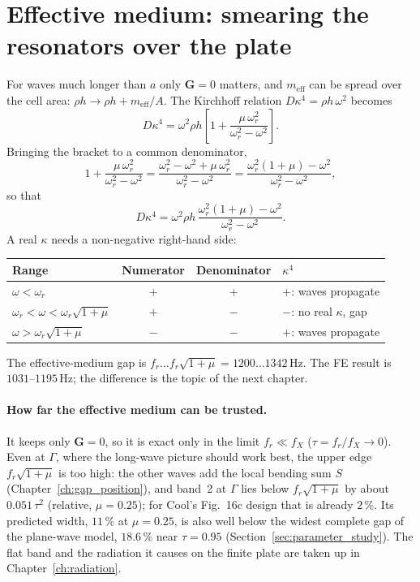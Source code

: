 \section{Effective medium: smearing the resonators over the plate}

For waves much longer than $a$ only $\mathbf{G} = 0$ matters, and $m_\mathrm{eff}$
can be spread over the cell area: $\rho h \to \rho h + m_\mathrm{eff}/A$. The
Kirchhoff relation $D\kappa^4 = \rho h\,\omega^2$ becomes
\begin{equation}
  D\kappa^4 = \omega^2 \rho h \left[1 + \frac{\mu\,\omega_r^2}{\omega_r^2 - \omega^2}\right] .
\end{equation}
Bringing the bracket to a common denominator,
\begin{equation}
  1 + \frac{\mu\,\omega_r^2}{\omega_r^2 - \omega^2}
  = \frac{\omega_r^2 - \omega^2 + \mu\,\omega_r^2}{\omega_r^2 - \omega^2}
  = \frac{\omega_r^2(1 + \mu) - \omega^2}{\omega_r^2 - \omega^2},
\end{equation}
so that
\begin{equation}
  D\kappa^4 = \omega^2 \rho h\,\frac{\omega_r^2(1 + \mu) - \omega^2}{\omega_r^2 - \omega^2} .
  \label{eq:effective_medium}
\end{equation}
A real $\kappa$ needs a non-negative right-hand side:
\begin{center}
\begin{tabular}{|l|c|c|l|}
\hline
Range & Numerator & Denominator & $\kappa^4$ \\
\hline
$\omega < \omega_r$ & $+$ & $+$ & $+$: waves propagate \\
$\omega_r < \omega < \omega_r\sqrt{1+\mu}$ & $+$ & $-$ & $-$: no real $\kappa$, gap \\
$\omega > \omega_r\sqrt{1+\mu}$ & $-$ & $-$ & $+$: waves propagate \\
\hline
\end{tabular}
\end{center}
The effective-medium gap is $f_r \dots f_r\sqrt{1+\mu} = 1200 \dots
1342\,\mathrm{Hz}$. The FE result is $1031$--$1195\,\mathrm{Hz}$; the difference
is the topic of the next chapter.

\paragraph{How far the effective medium can be trusted.} It keeps only
$\mathbf{G} = 0$, so it is exact only in the limit $f_r \ll f_X$
($\tau = f_r/f_X \to 0$). Even at $\Gamma$, where the long-wave picture should work
best, the upper edge $f_r\sqrt{1+\mu}$ is too high: the other waves add the local
bending sum $S$ (Chapter~\ref{ch:gap_position}), and band~2 at $\Gamma$ lies below
$f_r\sqrt{1+\mu}$ by about $0.051\,\tau^2$ (relative, $\mu = 0.25$); for Cool's
Fig.~16c design that is already $2\,\%$. Its predicted width, $11\,\%$ at
$\mu = 0.25$, is also well below the widest complete gap of the plane-wave model,
$18.6\,\%$ near $\tau = 0.95$ (Section~\ref{sec:parameter_study}). The flat band and
the radiation it causes on the finite plate are taken up in
Chapter~\ref{ch:radiation}.

